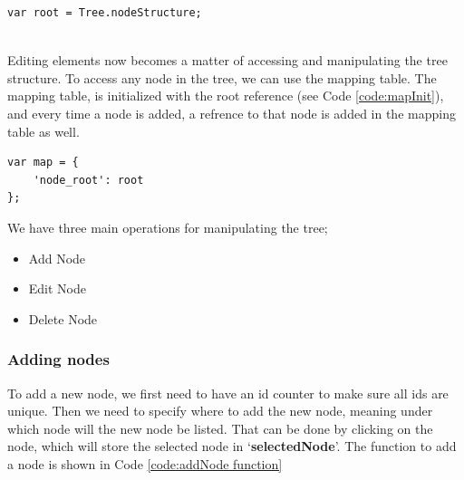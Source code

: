 \documentclass[11pt]{article} %
\begin{document}
\noindent
\begin{minipage}[c]{\linewidth}
\begin{lstlisting}[basicstyle=\scriptsize, tabsize=4, frame=single, caption=Root assignment, label=code:rootAssignment]
var root = Tree.nodeStructure;
\end{lstlisting}
\end{minipage}
\\[12pt]
\noindent
Editing elements now becomes a matter of accessing and manipulating the tree structure. To access any node in the tree, we can use the mapping table. The mapping table, is initialized with the root reference (see Code \ref{code:mapInit}), and every time a node is added, a refrence to that node is added in the mapping table as well.

\noindent
\begin{minipage}[c]{\linewidth}
\begin{lstlisting}[basicstyle=\scriptsize, tabsize=4, frame=single, caption=Mapping the tree root, label=code:mapInit]
var map = {
	'node_root': root
};

\end{lstlisting}
\end{minipage}

\noindent
We have three main operations for manipulating the tree;

\begin{itemize}
\item Add Node
\item Edit Node
\item Delete Node
\end{itemize}

\subsubsection{Adding nodes}
To add a new node, we first need to have an id counter to make sure all ids are unique. Then we need to specify where to add the new node, meaning under which node will the new node be listed. That can be done by clicking on the node, which will store the selected node in `\textbf{selectedNode}'. The function to add a node is shown in Code \ref{code:addNode function}
\end{document}
